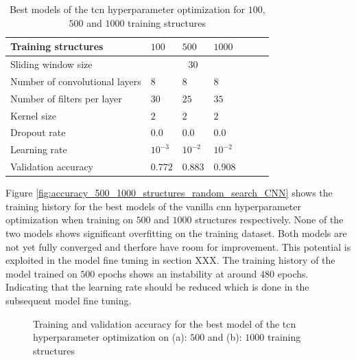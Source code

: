 \documentclass[conference]{IEEEtran}
\begin{document}
\begin{table}[htp]
	\centering
	\caption{Best models of the \gls{tcn} hyperparameter optimization for $ 100 $, $ 500 $ and $ 1000 $ training structures}
	\label{tab:hyperparameters_100_500_1000_structures_TCN}
	\begin{tabular}{p{2.5cm}|llllll}
		Training structures & $ 100 $ & $ 500 $ & $ 1000 $ \\
		\hline
		Sliding window size & \multicolumn{3}{c}{$ 30 $} \\
		\hline
		Number of convolutional layers & $ 8 $ & $ 8 $ & $ 8 $ \\
		Number of filters per layer & $ 30 $ & $ 25 $ & $ 35 $ \\
		Kernel size & $ 2 $ & $ 2 $ & $ 2 $ \\
		Dropout rate & $ 0.0 $ & $ 0.0 $ & $ 0.0 $ \\
		Learning rate & $ 10^{-3} $ & $ 10^{-2} $ & $ 10^{-2} $ \\
		\hline
		Validation accuracy & $ 0.772 $ & $ 0.883 $ & $ 0.908 $
	\end{tabular}
\end{table}

Figure \ref{fig:accuracy_500_1000_structures_random_search_CNN} shows the training history for the best models of the vanilla \gls{cnn} hyperparameter optimization when training on $ 500 $ and $ 1000 $ structures respectively. None of the two models shows significant overfitting on the training dataset. Both models are not yet fully converged and therfore have room for improvement. This potential is exploited in the model fine tuning in section XXX. The training history of the model trained on $ 500 $ epochs shows an instability at around $ 480 $ epochs. Indicating that the learning rate should be reduced which is done in the subsequent model fine tuning.

\begin{figure}[htp]
	\centering
	\quad
	\caption{Training and validation accuracy for the best model of the \gls{tcn} hyperparameter optimization on (a): $ 500 $ and (b): $ 1000 $ training structures}
	\label{fig:accuracy_500_1000_structures_random_search_TCN}
\end{figure}
\end{document}
